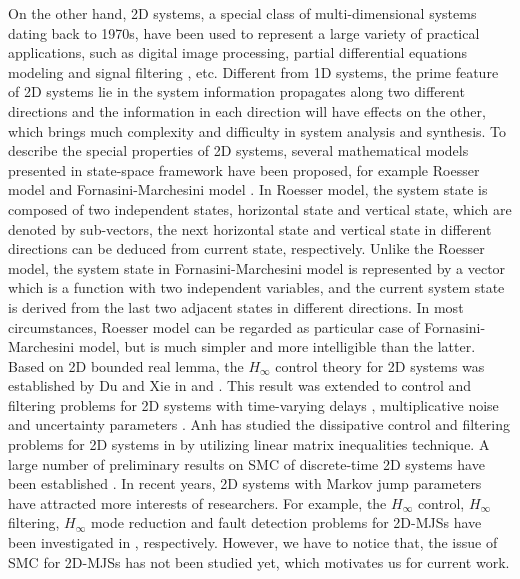 \documentclass[journal,final,twocolumn]{IEEEtran}
\begin{document}
	
	On the other hand, 2D systems, a special class of multi-dimensional systems  dating back to 1970s,  have been used to represent a large variety of practical applications, such as digital image processing, partial differential equations modeling and signal filtering \cite{roesser1975discrete,marszalek1984two,rogers2015multidimensional}, etc. Different from 1D systems, the prime feature of  2D systems lie in the system information propagates along two different directions and the information in each direction will have effects on the other, which brings much complexity and difficulty in system analysis and synthesis. To describe the special properties of 2D systems, several  mathematical models presented in state-space framework have been proposed, for example Roesser model \cite{roesser1975discrete} and Fornasini-Marchesini model \cite{fornasini1978doubly}. In Roesser model, the system state is composed of two independent states, horizontal state and vertical state, which are denoted by  sub-vectors, the next horizontal state and vertical state in different directions can be deduced from current state, respectively. Unlike the Roesser model, the system state in Fornasini-Marchesini model is represented by a vector which is a function with two independent variables, and the current system state is derived from the  last two adjacent states in different directions. In most circumstances, Roesser model can be regarded as particular case of Fornasini-Marchesini model, but is much simpler and more intelligible than the latter. Based on 2D bounded real lemma, the $H_{\infty}$ control theory for 2D systems was established by Du and Xie in \cite{du2001h} and \cite{du2002hinfinity}. This result was extended to control and filtering problems for 2D systems with time-varying delays \cite{trinh2016stability},  multiplicative noise \cite{ahn2016stochastic} and uncertainty parameters \cite{chesi2016robust}. 
	Anh has studied  the dissipative control and filtering problems for 2D systems in \cite{ahn2015two}  by utilizing linear matrix inequalities technique.
	A large number of preliminary results on SMC of discrete-time 2D systems have been established \cite{liu2005adaptive,wu2008sliding,yang2019two}.
	In recent years, 2D systems with Markov jump parameters have attracted more interests of researchers. For example,  the $H_{\infty}$ control, $H_{\infty}$ filtering, $H_{\infty}$ mode reduction and fault detection problems for 2D-MJSs have been investigated in \cite{gao2004stabilization,wu2018hcontrol2d,wu2008hfiltering2d,wu2006modelreduction,shen2019dissipativity}, respectively. However, we have to notice that, the issue of SMC  for 2D-MJSs has not been studied yet, which motivates us for current work.
	 
\end{document}

